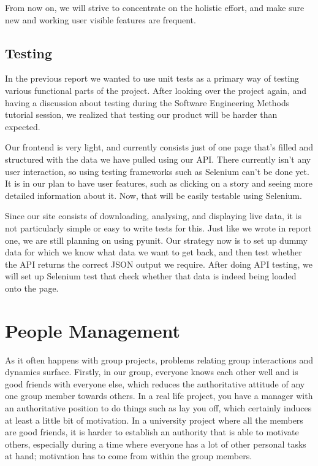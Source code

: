 \documentclass[a4paper,12pt]{article}
\begin{document}
	From now on, we will strive to concentrate on the holistic effort, and make sure new and working user visible features are frequent.
	
	\subsection{Testing}
	
	In the previous report we wanted to use unit tests as a primary way of testing various functional parts of the project. After looking over the project again, and having a discussion about testing during the Software Engineering Methods tutorial session, we realized that testing our product will be harder than expected.
	
	Our frontend is very light, and currently consists just of one page that's filled and structured with the data we have pulled using our API. There currently isn't any user interaction, so using testing frameworks such as Selenium can't be done yet. It is in our plan to have user features, such as clicking on a story and seeing more detailed information about it. Now, that will be easily testable using Selenium.
	
	Since our site consists of downloading, analysing, and displaying live data, it is not particularly simple or easy to write tests for this. Just like we wrote in report one, we are still planning on using pyunit. Our strategy now is to set up dummy data for which we know what data we want to get back, and then test whether the API returns the correct JSON output we require. After doing API testing, we will set up Selenium test that check whether that data is indeed being loaded onto the page.
	
	\section{People Management}
	
	As it often happens with group projects, problems relating group interactions and dynamics surface. Firstly, in our group, everyone knows each other well and is good friends with everyone else, which reduces the authoritative attitude of any one group member towards others. In a real life project, you have a manager with an authoritative position to do things such as lay you off, which certainly induces at least a little bit of motivation. In a university project where all the members are good friends, it is harder to establish an authority that is able to motivate others, especially during a time where everyone has a lot of other personal tasks at hand; motivation has to come from within the group members.
	
\end{document}
